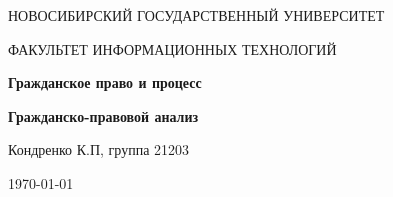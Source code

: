 \begin{center}
	{\LARGE \textsc{НОВОСИБИРСКИЙ ГОСУДАРСТВЕННЫЙ УНИВЕРСИТЕТ}\par}
	{\textsc{ФАКУЛЬТЕТ ИНФОРМАЦИОННЫХ ТЕХНОЛОГИЙ}\par}
	
	\vspace{3cm}
	
	{\huge\bfseries Гражданское право и процесс\par}
	
	\vspace{1cm}
	
	{\Large\bfseries Гражданско-правовой анализ\par}
	
	\vspace{10cm}
	
	\begin{flushright}
		Кондренко К.П, группа 21203
	\end{flushright}
	
	\vfill
	
	{\large \today\par}
\end{center}